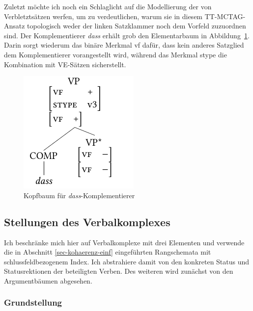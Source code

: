Zuletzt möchte ich noch ein Schlaglicht auf die Modellierung der  von Verbletztsätzen werfen, um zu verdeutlichen, warum sie in diesem TT-MCTAG-Ansatz topologisch weder der linken Satzklammer noch dem Vorfeld zuzuordnen sind. Der Komplementierer {\it dass} erhält grob den Elementarbaum in Abbildung~\ref{fig-ttmctag-comp}. Darin sorgt wiederum das binäre Merkmal {\sc vf} dafür, dass kein anderes Satzglied dem Komplementierer vorangestellt wird, während das  Merkmal {\sc stype} die Kombination mit VE-Sätzen sicherstellt.

\begin{figure}[t]
\centering
\includegraphics{graphics/abb79.pdf}
\caption{\label{fig-ttmctag-comp}Kopfbaum für \emph{dass}-Komplementierer}
\end{figure} 
  

\subsection{Stellungen des Verbalkomplexes}

Ich beschränke mich hier auf Verbalkomplexe mit drei Elementen und verwende die in Abschnitt \ref{sec-kohaerenz-einf} eingeführten Rangschemata mit schlussfeldbezogenem Index. Ich abstrahiere damit von den konkreten Status und Statusrektionen der beteiligten Verben. Des weiteren wird zunächst von den Argumentbäumen abgesehen.

\subsubsection*{Grundstellung}

